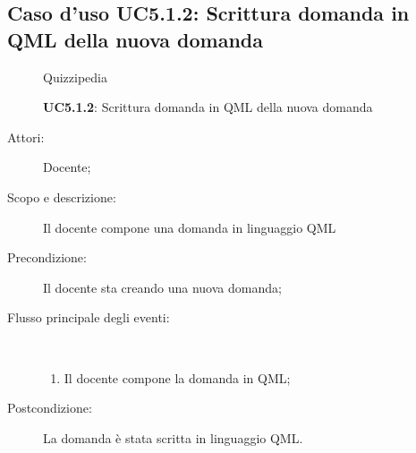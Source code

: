 \subsection{Caso d'uso UC5.1.2: Scrittura domanda in QML della nuova domanda}
	\begin{figure}[H]
		\centering
		\begin{resizedtikzpicture}{\textwidth}
		\begin{umlsystem}[x=0, fill=lightgray!20]{Quizzipedia}
		\end{umlsystem}
		\end{resizedtikzpicture}
		\caption{\textbf{UC5.1.2}: Scrittura domanda in QML della nuova domanda}
		\label{UC5.1.2}
	\end{figure}
\begin{description}
\item[Attori:] Docente;
\item[Scopo e descrizione:] Il docente compone una domanda in linguaggio QML
      \item[Precondizione:] Il docente sta creando una nuova domanda;

        \item[Flusso principale degli eventi:] \ 
 \begin{enumerate}
          \item Il docente compone la domanda in QML;

      \end{enumerate}
    \item[Postcondizione:] La domanda è stata scritta in linguaggio QML.
  \end{description}
\hypertarget{UC5.1.3}{}
